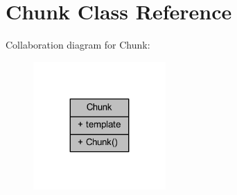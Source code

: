 \hypertarget{class_chunk}{}\section{Chunk Class Reference}
\label{class_chunk}


Collaboration diagram for Chunk\+:\nopagebreak
\begin{figure}[H]
\begin{center}
\leavevmode
\includegraphics[width=143pt]{class_chunk__coll__graph}
\end{center}
\end{figure}
